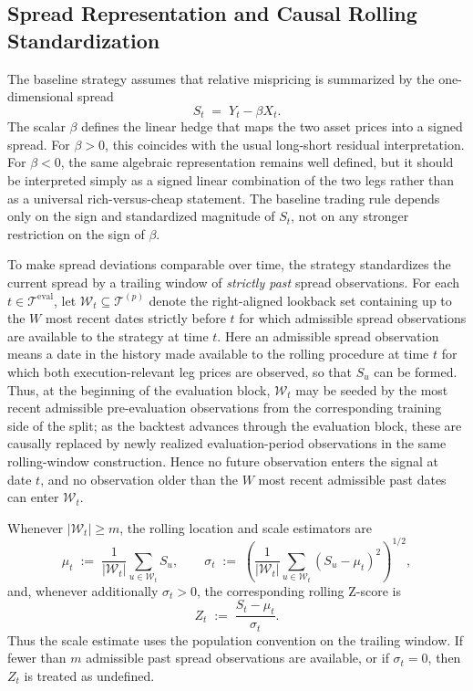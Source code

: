 \documentclass[11pt,a4paper]{article}
\begin{document}
\subsection{Spread Representation and Causal Rolling Standardization}

The baseline strategy assumes that relative mispricing is summarized by the
one-dimensional spread
\[
  S_t \;=\; Y_t - \beta X_t.
\]
The scalar \(\beta\) defines the linear hedge that maps the two asset prices
into a signed spread. For \(\beta>0\), this coincides with the usual long-short
residual interpretation. For \(\beta<0\), the same algebraic representation
remains well defined, but it should be interpreted simply as a signed linear
combination of the two legs rather than as a universal rich-versus-cheap
statement. The baseline trading rule depends only on the sign and standardized
magnitude of \(S_t\), not on any stronger restriction on the sign of
\(\beta\).

To make spread deviations comparable over time, the strategy standardizes the
current spread by a trailing window of \emph{strictly past} spread
observations. For each \(t \in \mathcal T^{\mathrm{eval}}\), let
\(\mathcal W_t \subseteq \mathcal T^{(p)}\) denote the right-aligned lookback set
containing up to the \(W\) most recent dates strictly before \(t\) for which
admissible spread observations are available to the strategy at time \(t\).
Here an admissible spread observation means a date in the history made
available to the rolling procedure at time \(t\) for which both
execution-relevant leg prices are observed, so that \(S_u\) can be formed.
Thus, at the beginning of the evaluation block, \(\mathcal W_t\) may be seeded
by the most recent admissible pre-evaluation observations from the
corresponding training side of the split; as the backtest advances through the
evaluation block, these are causally replaced by newly realized
evaluation-period observations in the same rolling-window construction. Hence
no future observation enters the signal at date \(t\), and no observation older
than the \(W\) most recent admissible past dates can enter \(\mathcal W_t\).

Whenever \(|\mathcal W_t| \ge m\), the rolling location and scale estimators
are
\[
  \mu_t
  \;:=\;
  \frac{1}{|\mathcal W_t|}
  \sum_{u \in \mathcal W_t} S_u,
  \qquad
  \sigma_t
  \;:=\;
  \left(
    \frac{1}{|\mathcal W_t|}
    \sum_{u \in \mathcal W_t} (S_u-\mu_t)^2
  \right)^{1/2},
\]
and, whenever additionally \(\sigma_t>0\), the corresponding rolling Z-score is
\[
  Z_t \;:=\; \frac{S_t-\mu_t}{\sigma_t}.
\]
Thus the scale estimate uses the population convention on the trailing window.
If fewer than \(m\) admissible past spread observations are available, or if
\(\sigma_t=0\), then \(Z_t\) is treated as undefined.
\end{document}
